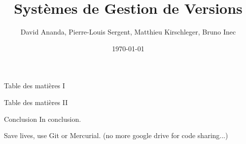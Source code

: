 \documentclass{beamer}
\title{Systèmes de Gestion de Versions}
\date{\today}
\author{David Ananda, Pierre-Louis Sergent, Matthieu Kirschleger, Bruno Inec}
\institute{IUT informatique Lyon1}
\begin{document}
  \maketitle

  \begin{frame}{Table des matières I}
    \tableofcontents[sections={1}]
      \framebreak
    \tableofcontents[sections={2}]
  \end{frame}
  \begin{frame}{Table des matières II}
    \tableofcontents[sections={3}]
  \end{frame}

  
  
  

  \begin{frame}{Conclusion}
    \Large
    In conclusion.

    Save lives, use Git or Mercurial. (no more google drive for code sharing...)
  \end{frame}
\end{document}
